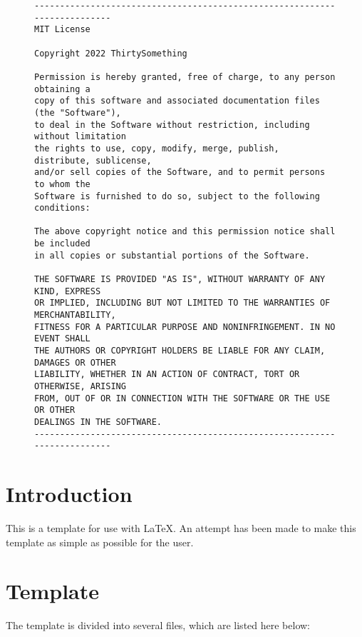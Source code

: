 \begin{figure}[H]
    \footnotesize
    \centering
    \begin{BVerbatim}
--------------------------------------------------------------------------
MIT License

Copyright 2022 ThirtySomething

Permission is hereby granted, free of charge, to any person obtaining a
copy of this software and associated documentation files (the "Software"),
to deal in the Software without restriction, including without limitation
the rights to use, copy, modify, merge, publish, distribute, sublicense,
and/or sell copies of the Software, and to permit persons to whom the
Software is furnished to do so, subject to the following conditions:

The above copyright notice and this permission notice shall be included
in all copies or substantial portions of the Software.

THE SOFTWARE IS PROVIDED "AS IS", WITHOUT WARRANTY OF ANY KIND, EXPRESS
OR IMPLIED, INCLUDING BUT NOT LIMITED TO THE WARRANTIES OF MERCHANTABILITY,
FITNESS FOR A PARTICULAR PURPOSE AND NONINFRINGEMENT. IN NO EVENT SHALL
THE AUTHORS OR COPYRIGHT HOLDERS BE LIABLE FOR ANY CLAIM, DAMAGES OR OTHER
LIABILITY, WHETHER IN AN ACTION OF CONTRACT, TORT OR OTHERWISE, ARISING
FROM, OUT OF OR IN CONNECTION WITH THE SOFTWARE OR THE USE OR OTHER
DEALINGS IN THE SOFTWARE.
--------------------------------------------------------------------------
    \end{BVerbatim}
\end{figure}

\section{Introduction}

This is a template for use with \LaTeX{}. An attempt has been made to make
this template as simple as possible for the user.

\section{Template}

The template is divided into several files, which are listed here below:

